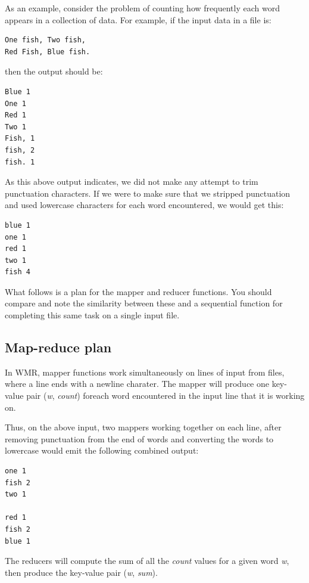 \documentclass[letterpaper,10pt,openany,oneside]{sphinxmanual}
\begin{document}
As an example, consider the problem of counting how frequently each
word appears in a collection of data. For example, if the input
data in a file is:

\begin{Verbatim}[commandchars=\\\{\}]
One fish, Two fish,
Red Fish, Blue fish.
\end{Verbatim}

then the output should be:

\begin{Verbatim}[commandchars=\\\{\}]
Blue 1
One 1
Red 1
Two 1
Fish, 1
fish, 2
fish. 1
\end{Verbatim}

As this above output indicates, we did not make any attempt to trim
punctuation characters.  If we were to
make sure that we stripped punctuation and used lowercase characters
for each word encountered, we would get this:

\begin{Verbatim}[commandchars=\\\{\}]
blue 1
one 1
red 1
two 1
fish 4
\end{Verbatim}

What follows is a plan for the mapper and reducer functions. You
should compare and note the similarity between these and a
sequential function for completing this same task on a single input
file.


\subsection{Map-reduce plan}
\label{wmr_py/wmr_py:map-reduce-plan}
In WMR, mapper functions work simultaneously on lines of input from
files, where a line ends with a newline charater. The mapper will
produce one key-value pair (\emph{w}, \emph{count}) foreach word encountered
in the input line that it is working on.

Thus, on the above input, two mappers working together on each line,
after removing punctuation from the end of words and converting the
words to lowercase
would emit the following combined output:

\begin{Verbatim}[commandchars=\\\{\}]
one 1
fish 2
two 1

red 1
fish 2
blue 1
\end{Verbatim}

The reducers will compute the sum of all the \emph{count} values for a
given word \emph{w}, then produce the key-value pair (\emph{w}, \emph{sum}).
\end{document}
